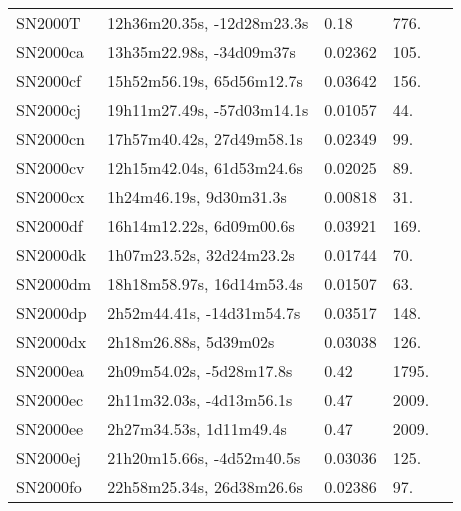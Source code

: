 \begin{longtable}{lllll}
          SN2000T &     12h36m20.35s, -12d28m23.3s &     0.18 &           776. &    \citet{2000IAUC.7384A...1A} \\
         SN2000ca &       13h35m22.98s, -34d09m37s &  0.02362 &           105. &    \citet{2003MNRAS.339..652K} \\
         SN2000cf &      15h52m56.19s, 65d56m12.7s &  0.03642 &           156. &    \citet{2000IAUC.7423B...1J} \\
         SN2000cj &     19h11m27.49s, -57d03m14.1s &  0.01057 &            44. &    \citet{2006HIPAS.C...0000:} \\
         SN2000cn &      17h57m40.42s, 27d49m58.1s &  0.02349 &            99. &    \citet{1991RC3.9.C...0000d} \\
         SN2000cv &      12h15m42.04s, 61d53m24.6s &  0.02025 &            89. &    \citet{2004SDSS2.C...0000:} \\
         SN2000cx &        1h24m46.19s, 9d30m31.3s &  0.00818 &            31. &    \citet{2004MNRAS.347.1150B} \\
         SN2000df &       16h14m12.22s, 6d09m00.6s &  0.03921 &           169. &    \citet{1999PASP..111..438F} \\
         SN2000dk &       1h07m23.52s, 32d24m23.2s &  0.01744 &            70. &    \citet{2002AJ....123.3018M} \\
         SN2000dm &      18h18m58.97s, 16d14m53.4s &  0.01507 &            63. &    \citet{2008ApJ...685..752G} \\
         SN2000dp &      2h52m44.41s, -14d31m54.7s &  0.03517 &           148. &    \citet{20096dF...C...0000J} \\
         SN2000dx &          2h18m26.88s, 5d39m02s &  0.03038 &           126. &    \citet{1996ApJ...460..686C} \\
         SN2000ea &       2h09m54.02s, -5d28m17.8s &     0.42 &          1795. &    \citet{2000IAUC.7516A...1S} \\
         SN2000ec &       2h11m32.03s, -4d13m56.1s &     0.47 &          2009. &    \citet{2000IAUC.7516A...1S} \\
         SN2000ee &        2h27m34.53s, 1d11m49.4s &     0.47 &          2009. &    \citet{2000IAUC.7516A...1S} \\
         SN2000ej &      21h20m15.66s, -4d52m40.5s &  0.03036 &           125. &  \citet{1999AandAS..140..327M} \\
         SN2000fo &      22h58m25.34s, 26d38m26.6s &  0.02386 &            97. &    \citet{1991RC3.9.C...0000d} \\

\end{longtable}
